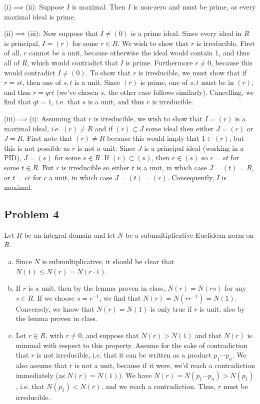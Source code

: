 \documentclass{../../mathnotes}
\begin{document}
(i)$\implies$(ii): Suppose $I$ is maximal. Then $I$ is non-zero and must be prime, as every maximal ideal is prime.

(ii)$\implies$(iii): Now suppose that $I\neq (0)$ is a prime ideal. Since every ideal in $R$ is principal, $I=(r)$ for
some $r\in R$. We wish to show that $r$ is irreducible. First of all, $r$ cannot be a unit, because otherwise the ideal would
contain 1, and thus all of $R$, which would contradict that $I$ is prime. Furthermore $r\neq 0$, because this would contradict
$I\neq(0)$. To show that $r$ is irreducible, we must show that if $r=st$, then one of $s,t$ is a unit. Since $(r)$ is prime,
one of $s,t$ must be in $(r)$, and thus $r=qrt$ (we've chosen $s$, the other case follows similarly). Cancelling, we find that $qt=1$,
i.e. that $s$ is a unit, and thus $r$ is irreducible.

(iii)$\implies$(i): Assuming that $r$ is irreducible, we wish to show that $I=(r)$ is a maximal ideal, i.e. $(r)\neq R$ and if
$(r)\subset J$ some ideal then either $J=(r)$ or $J=R$. First note that $(r)\neq R$ because this would imply that $1\in(r)$,
but this is not possible as $r$ is not a unit. Since $J$ is a principal ideal (working in a PID), $J=(s)$ for some $s\in R$.
If $(r)\subset(s)$, then $r\in(s)$ so $r=st$ for some $t\in R$. But $r$ is irreducible so either $t$ is a unit, in which case
$J=(t)=R$, or $t=cr$ for $c$ a unit, in which case $J=(t)=(r).$ Consequently, $I$ is maximal.

\subsection*{Problem 4}

Let $R$ be an integral domain and let $N$ be a submultiplicative Euclidean norm on $R$.

\begin{enumerate}[(a)]
    \item Since $N$ is submultiplicative, it should be clear that $N(1)\leq N(r)=N(r\cdot 1)$.
    \item If $r$ is a unit, then by the lemma proven in class, $N(r)=N(rs)$ for any $s\in R$. If we choose $s=r^{-1}$, we find that
        $N(r)=N(rr^{-1})=N(1)$. Conversely, we know that $N(r)=N(1)$ is only true if $r$ is unit, also by the lemma proven in class.
    \item Let $r\in R$, with $r\neq0$, and suppose that $N(r)>N(1)$ and that $N(r)$ is minimal with respect to this property.
        Assume for the sake of contradiction that $r$ is not irreducible, i.e. that it can be written as a product $p_1\cdots p_n$.
        We also assume that $r$ is not a unit, because if it were, we'd reach a contradiction immediately (as $N(r)=N(1)$).
        We have $N(r)=N(p_1\cdots p_n)>N(p_1)$, i.e. that $N(p_1)<N(r)$, and we reach a contradiction. Thus, $r$ must be irreducible.
\end{enumerate}
\end{document}
